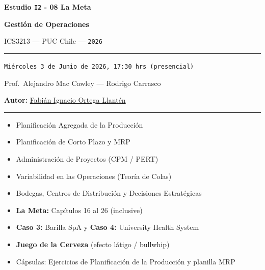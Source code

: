 \documentclass[11pt, a4paper]{article}
\begin{document}
\begin{titlepage}
  \centering
  \vspace*{2cm}
  {\Huge\bfseries\color{gopcyan} Estudio \texttt{I2} - 08 La Meta\par}
  \vspace{0.4cm}
  {\LARGE\bfseries Gestión de Operaciones\par}
  \vspace{0.3cm}
  {\large ICS3213 --- PUC Chile --- \texttt{2026}\par}
  \vspace{1.2cm}
  \rule{\textwidth}{0.4pt}
  \vspace{0.4cm}

  {\normalsize \texttt{Miércoles 3 de Junio de 2026, 17:30 hrs (presencial)}\par}
  \vspace{0.2cm}
  {\small Prof.\ Alejandro Mac Cawley --- Rodrigo Carrasco\par}
  \vspace{0.2cm}
  {\small\textbf{Autor:} \href{https://cl.linkedin.com/in/fabian-ortega-llanten}{Fabián Ignacio Ortega Llantén}\par}
  \vspace{0.4cm}
  \rule{\textwidth}{0.4pt}
  \vspace{1cm}

  \begin{resumentemario}
    \begin{itemize}[leftmargin=1.2em, itemsep=2pt]
      \item Planificación Agregada de la Producción
      \item Planificación de Corto Plazo y MRP
      \item Administración de Proyectos (CPM / PERT)
      \item Variabilidad en las Operaciones (Teoría de Colas)
      \item Bodegas, Centros de Distribución y Decisiones Estratégicas
      \item \textbf{La Meta:} Capítulos 16 al 26 (inclusive)
      \item \textbf{Caso 3:} Barilla SpA \quad y \quad \textbf{Caso 4:} University Health System
      \item \textbf{Juego de la Cerveza} (efecto látigo / bullwhip)
      \item Cápsulas: Ejercicios de Planificación de la Producción y planilla MRP
    \end{itemize}
  \end{resumentemario}


\end{titlepage}
\end{document}
